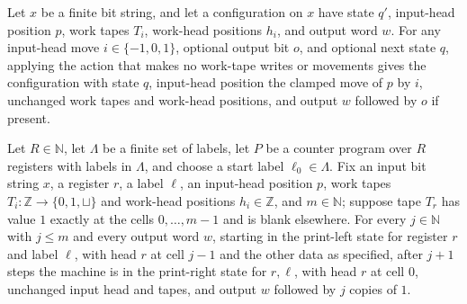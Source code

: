 \begin{theorem}
\label{Complexity.CounterProg.apply_ctl}
\leanok
{}
Let $x$ be a finite bit string, and let a configuration on $x$ have state $q'$,
input-head position $p$, work tapes $T_i$, work-head positions $h_i$, and output word
$w$. For any input-head move $i\in\{-1,0,1\}$, optional output bit $o$, and optional
next state $q$, applying the action that makes no work-tape writes or movements gives
the configuration with state $q$, input-head position the clamped move of $p$ by $i$,
unchanged work tapes and work-head positions, and output $w$ followed by $o$ if present.
\end{theorem}

\begin{theorem}
\label{Complexity.CounterProg.print_walk}
\leanok
{}
Let $R\in\mathbb{N}$, let $\Lambda$ be a finite set of labels, let $P$ be a counter
program over $R$ registers with labels in $\Lambda$, and choose a start label
$\ell_0\in\Lambda$. Fix an input bit string $x$, a register $r$, a label $\ell$, an
input-head position $p$, work tapes $T_i:\mathbb{Z}\to\{0,1,\sqcup\}$ and work-head
positions $h_i\in\mathbb{Z}$, and $m\in\mathbb{N}$; suppose tape $T_r$ has value $1$
exactly at the cells $0,\ldots,m-1$ and is blank elsewhere. For every $j\in\mathbb{N}$
with $j\le m$ and every output word $w$, starting in the print-left state for register
$r$ and label $\ell$, with head $r$ at cell $j-1$ and the other data as specified, after
$j+1$ steps the machine is in the print-right state for $r,\ell$, with head $r$ at cell
$0$, unchanged input head and tapes, and output $w$ followed by $j$ copies of $1$.
\end{theorem}

